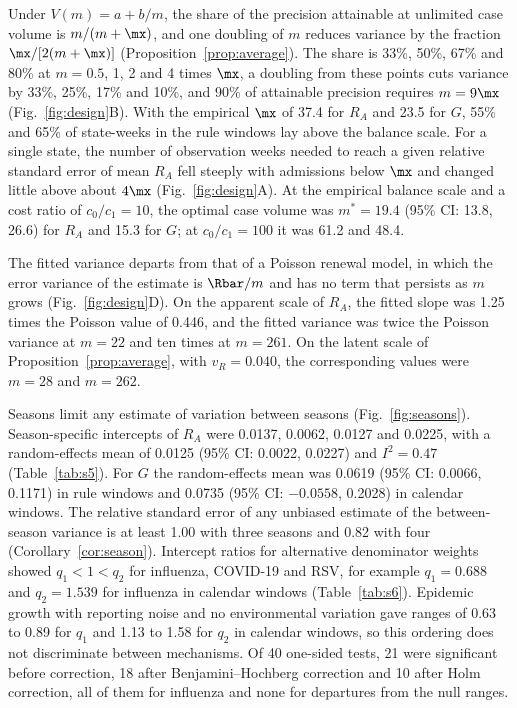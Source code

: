 Under $V(m)=a+b/m$, the share of the precision attainable at unlimited case volume is $m/(m+\mx)$, and one doubling of $m$ reduces variance by the fraction $\mx/[2(m+\mx)]$ (Proposition~\ref{prop:average}). The share is 33\%, 50\%, 67\% and 80\% at $m=0.5$, 1, 2 and 4 times $\mx$, a doubling from these points cuts variance by 33\%, 25\%, 17\% and 10\%, and 90\% of attainable precision requires $m=9\mx$ (Fig.~\ref{fig:design}B). With the empirical $\mx$ of 37.4 for $R_A$ and 23.5 for $G$, 55\% and 65\% of state-weeks in the rule windows lay above the balance scale. For a single state, the number of observation weeks needed to reach a given relative standard error of mean $R_A$ fell steeply with admissions below $\mx$ and changed little above about $4\mx$ (Fig.~\ref{fig:design}A). At the empirical balance scale and a cost ratio of $c_0/c_1=10$, the optimal case volume was $m^*=19.4$ (95\% CI: 13.8, 26.6) for $R_A$ and 15.3 for $G$; at $c_0/c_1=100$ it was 61.2 and 48.4.

The fitted variance departs from that of a Poisson renewal model, in which the error variance of the estimate is $\Rbar/m$ and has no term that persists as $m$ grows (Fig.~\ref{fig:design}D). On the apparent scale of $R_A$, the fitted slope was 1.25 times the Poisson value of 0.446, and the fitted variance was twice the Poisson variance at $m=22$ and ten times at $m=261$. On the latent scale of Proposition~\ref{prop:average}, with $v_R=0.040$, the corresponding values were $m=28$ and $m=262$.

Seasons limit any estimate of variation between seasons (Fig.~\ref{fig:seasons}). Season-specific intercepts of $R_A$ were 0.0137, 0.0062, 0.0127 and 0.0225, with a random-effects mean of 0.0125 (95\% CI: 0.0022, 0.0227) and $I^2=0.47$ (Table~\ref{tab:s5}). For $G$ the random-effects mean was 0.0619 (95\% CI: 0.0066, 0.1171) in rule windows and 0.0735 (95\% CI: $-0.0558$, 0.2028) in calendar windows. The relative standard error of any unbiased estimate of the between-season variance is at least 1.00 with three seasons and 0.82 with four (Corollary~\ref{cor:season}). Intercept ratios for alternative denominator weights showed $q_1<1<q_2$ for influenza, COVID-19 and RSV, for example $q_1=0.688$ and $q_2=1.539$ for influenza in calendar windows (Table~\ref{tab:s6}). Epidemic growth with reporting noise and no environmental variation gave ranges of 0.63 to 0.89 for $q_1$ and 1.13 to 1.58 for $q_2$ in calendar windows, so this ordering does not discriminate between mechanisms. Of 40 one-sided tests, 21 were significant before correction, 18 after Benjamini--Hochberg correction and 10 after Holm correction, all of them for influenza and none for departures from the null ranges.
